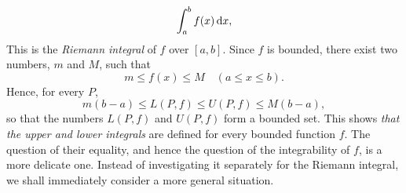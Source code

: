 \begin{mydef}
\begin{equation}
        \label{eq:6.4}
        \int_{a}^{b} f(x) \d x,
    \end{equation}
    This is the \emph{Riemann integral} of $f$ over $[a, b]$. 
    Since $f$ is bounded, there exist two numbers, $m$ and $M$, such that
    \begin{equation*}
        m \leq f(x) \leq M \quad 
        (a \leq x \leq b).
    \end{equation*}
    Hence, for every $P$,
    \begin{equation*}
        m(b - a) \leq L(P,f) \leq U(P,f) \leq M(b - a),
    \end{equation*}
    so that the numbers $L(P,f)$ and $U(P,f)$ form a bounded set. 
    This shows \emph{that the upper and lower integrals} are defined for every bounded function $f$.
    The question of their equality, 
    and hence the question of the integrability of $f$, is a more delicate one. 
    Instead of investigating it separately for the Riemann integral,
    we shall immediately consider a more general situation.
\end{mydef}

